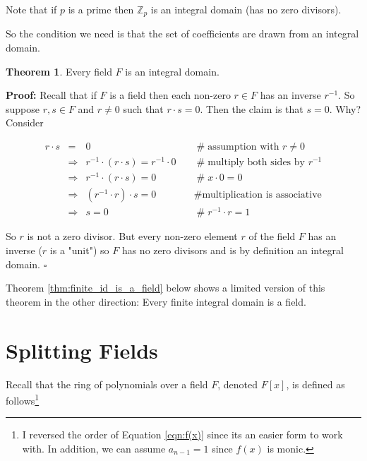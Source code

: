 \documentclass[11pt, oneside]{article}   	%
\theoremstyle{definition}
\newtheorem{thm}{Theorem}[section]
\begin{document}
\bigskip
\noindent
Note that if $p$ is a prime then $\mathbb{Z}_{p}$ is an integral domain (has no zero divisors).

\bigskip
\noindent
So the condition we need is that the set of coefficients are drawn from an integral domain. 


\begin{thm}
Every field $F$ is an integral domain.
\label{thm:integral_domain}
\end{thm}

\noindent
\textbf{Proof:} Recall that if $F$ is a field then each non-zero $r \in F$ has an inverse $r^{-1}$. 
So suppose $r,s \in F$ and $r \neq 0$ such that $r \cdot s = 0$. Then the claim is that $s = 0$.
Why? Consider


\begin{equation}
\begin{array}{rcll} 
r \cdot s 
&=& 0                                                                                &\quad  \mathrel{\#} \text{assumption with $r \neq 0$}         \\
&\Rightarrow& r^{-1} \cdot (r \cdot s) = r^{-1} \cdot 0        &\quad  \mathrel{\#} \text{multiply both sides by $r^{-1}$}    \\
&\Rightarrow&  r^{-1} \cdot (r \cdot s) =  0                        &\quad  \mathrel{\#} x \cdot 0 = 0                                          \\
&\Rightarrow&  (r^{-1} \cdot r) \cdot s =  0                        &\quad  \mathrel{\#} \text{multiplication is associative}         \\
&\Rightarrow&  s = 0                                                         &\quad  \mathrel{\#} r^{-1} \cdot r = 1
\end{array}
\end{equation}

\bigskip
\noindent
So $r$ is not a zero divisor. But every non-zero element $r$ of the field $F$ has an inverse ($r$ is a "unit")
so $F$ has no zero divisors and is by definition an integral 
domain. $\square$

\bigskip
\noindent
Theorem \ref{thm:finite_id_is_a_field} below shows a limited version of this theorem in the other direction: 
Every finite integral domain is a field.

\section{Splitting Fields}
Recall that the ring of polynomials over a field $F$, denoted $F[x]$, is defined as follows\footnote{I reversed the order
of Equation \ref{eqn:f(x)} since its an easier form to work with. In addition, we can assume $a_{n-1} = 1$ since $f(x)$ 
is monic.}
\end{document}
